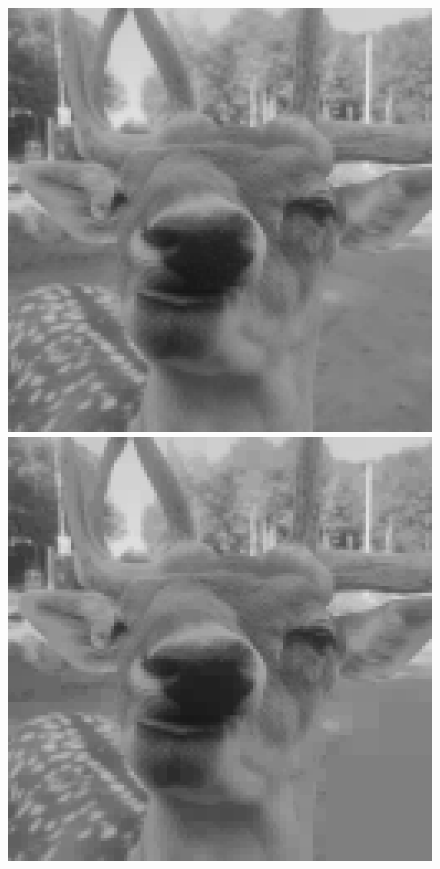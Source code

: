 \documentclass{article}
\begin{document}
\begin{figure}[h]
\centerline{\includegraphics[scale=0.4]{./pierrelouisdiviserecursiveseuil2.png}}
\includegraphics[scale=0.4]{./pierrelouisdiviserecursiveseuil25.png}

\end{figure}
\end{document}
